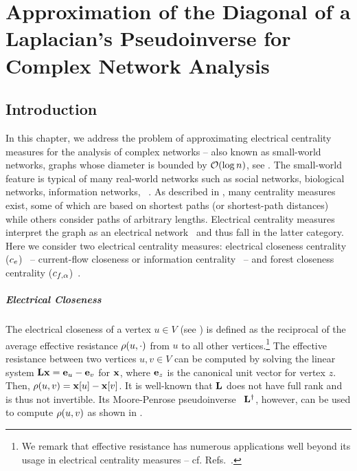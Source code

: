 \chapter{Approximation of the Diagonal of a Laplacian’s Pseudoinverse for Complex Network Analysis}
\label{ch:electrical-closeness}

\section{Introduction}
\label{sec:el-clos:intro}
%
In this chapter, we address the problem of approximating electrical centrality
measures for the analysis of complex networks -- also known as
small-world networks, \ie graphs whose diameter is bounded by $\mathcal{O}(\log n)$,
see .
The small-world feature is typical of many real-world
networks such as social networks, biological networks, information networks,
\etc~\cite{newman2018networks}. As described in ,
many centrality measures exist, some of which are based on shortest paths (or
shortest-path distances) while others consider paths of arbitrary lengths.
Electrical centrality measures interpret the graph as an electrical
network~\cite{lovasz1993random} and thus fall in the latter category. Here we
consider two electrical centrality measures: electrical closeness
centrality ($c_e$)~\cite{DBLP:conf/stacs/BrandesF05} -- \aka current-flow
closeness or information centrality~\cite{stephenson1989rethinking} -- and
forest closeness centrality ($c_{f,\alpha}$)~\cite{DBLP:conf/icdm/JinBZ19}.

\paragraph{Electrical Closeness}
The electrical closeness of a vertex $u \in V$ (see
) is defined as the reciprocal of the average
effective resistance $\rho(u, \cdot)$ from $u$ to all other
vertices.\footnote{We remark that effective resistance
has numerous applications well beyond its usage in electrical centrality measures -- cf.
Refs.~\cite{DBLP:conf/innovations/AlevALG18,DBLP:journals/siamrev/GhoshBS08}.}
The effective resistance between two vertices $u, v\in V$ can be computed by solving
the linear system $\mathbf{L}\mathbf{x} = \mathbf{e}_{u} - \mathbf{e}_{v}$ for $\mathbf{x}$, where
$\mathbf{e}_{z}$ is the canonical unit vector for vertex $z$. Then,
$\rho(u, v) = \mathbf{x}[u] - \mathbf{x}[v]$.
It is well-known that $\mathbf{L}$ does not have full rank and is thus not invertible.
Its Moore-Penrose pseudoinverse~\cite{DBLP:books/daglib/0086372} $\mathbf{L}^\dagger$,
however, can be used to compute $\rho(u, v)$ as shown in
.

